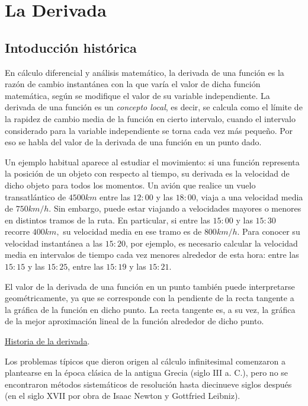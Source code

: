 \chapter{La Derivada}	\label{ch-la-derivada}

	\section{Intoducción histórica}
	
	En cálculo diferencial y análisis matemático, la derivada de una función es la razón de  cambio instantánea con la que varía el valor de dicha función matemática, según se  modifique el valor de su variable independiente. La derivada de una función es un \emph{concepto local}, es decir, se calcula como el límite de la rapidez de cambio media de la función en cierto intervalo, cuando el intervalo considerado para la variable independiente se torna cada vez más pequeño. Por eso se habla del valor de la derivada de una función en un punto dado.
		
	
	Un ejemplo habitual aparece al estudiar el movimiento: si una función representa la posición de un objeto con respecto al tiempo, su derivada es la velocidad de dicho objeto para todos los momentos. Un avión que realice un vuelo transatlántico de 
$4500 km$ entre las $12:00$ y las $18:00$, viaja a una velocidad media de $750 km/h$. Sin embargo, puede estar viajando a velocidades mayores o menores en distintos tramos de la ruta. En particular, si entre las $15:00$ y las $15:30$ recorre $400 km,$ su velocidad media en ese tramo es de $800 km/h$. Para conocer su velocidad instantánea a las $15:20$, por ejemplo, es necesario calcular la velocidad media en intervalos de tiempo cada vez menores alrededor de esta hora: entre las $15:15$ y las $15:25$, entre las $15:19$ y las $15:21$.
	
El valor de la derivada de una función en un punto también puede interpretarse geométricamente, ya que se corresponde con la pendiente de la recta tangente a la gráfica de la función en dicho punto. La recta tangente es, a su vez, la gráfica de la mejor aproximación lineal de la función alrededor de dicho punto. 

\underline{Historia de la derivada}.
	
Los problemas típicos que dieron origen al cálculo infinitesimal comenzaron a plantearse en la época clásica de la antigua Grecia (siglo III a. C.), pero no se encontraron métodos sistemáticos de resolución hasta diecinueve siglos después (en el siglo XVII por obra de Isaac Newton y Gottfried Leibniz).
	
